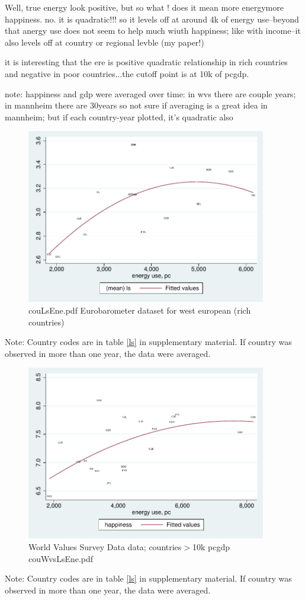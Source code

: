 \documentclass[10pt, letterpaper]{article}
\begin{document}
\begin{spacing}{1.4}
Well, true energy look positive, but so what ! does it mean more energymore
happiness. no. it is quadratic!!! so it levels off at around 4k of energy
use--beyond that anergy use does not seem to help much wiuth happiness; like
with income--it also levels off at country or regional levble (my paper!)

it is interesting that the ere is positive quadratic relationship in rich
countries and negative in poor countries...the cutoff point is at 10k of pcgdp.

note: happiness and gdp were averaged over time: in wvs there are couple years;
in mannheim there are 30years so not sure if averaging is a great idea in
mannheim; but if each country-year plotted, it's quadratic also 


\begin{figure}[H]
 \includegraphics[height=3in]{graphsAndTables/couLsEne.pdf}\centering
\caption{couLsEne.pdf Eurobarometer dataset for west european (rich countries)}\label{couLsEne.pdf}
\end{figure}
{\scriptsize Note: Country codes are in table \ref{ls} in supplementary
  material. If country was observed in more than one year, the data were averaged.}

\begin{figure}[H]
 \includegraphics[height=3in]{graphsAndTables/couWvsLsEne.pdf}\centering
\caption{World Values Survey Data data; countries$>$10k pcgdp couWvsLsEne.pdf}\label{couWvsLsEne.pdf}
\end{figure}
{\scriptsize Note: Country codes are in table \ref{ls} in supplementary
  material. If country was observed in more than one year, the data were averaged.}



\end{spacing}
\end{document}
